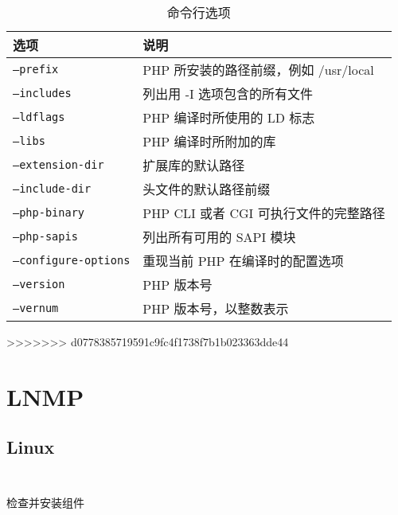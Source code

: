 \begin{table}[htbp]
\centering
\caption{命令行选项}
\begin{tabular}{|l|l|}
\hline
选项					&说明\\
\hline
\texttt{--prefix}			&PHP 所安装的路径前缀，例如 /usr/local\\
\hline
\texttt{--includes}		&列出用 -I 选项包含的所有文件\\
\hline
\texttt{--ldflags}			&PHP 编译时所使用的 LD 标志\\
\hline
\texttt{--libs}			&PHP 编译时所附加的库\\
\hline
\texttt{--extension-dir}	&扩展库的默认路径\\
\hline
\texttt{--include-dir}		&头文件的默认路径前缀\\
\hline
\texttt{--php-binary}		&PHP CLI 或者 CGI 可执行文件的完整路径\\
\hline
\texttt{--php-sapis}		&列出所有可用的 SAPI 模块\\
\hline
\texttt{--configure-options}	&重现当前 PHP 在编译时的配置选项\\
\hline
\texttt{--version}			&PHP 版本号\\
\hline
\texttt{--vernum}		&PHP 版本号，以整数表示\\
\hline
\end{tabular}
\end{table}
>>>>>>> d0778385719591c9fc4f1738f7b1b023363dde44



\chapter{LNMP}



\section{Linux}


\begin{lstlisting}[language=bash]

\end{lstlisting}




\begin{lstlisting}[language=bash]

\end{lstlisting}





检查并安装组件


